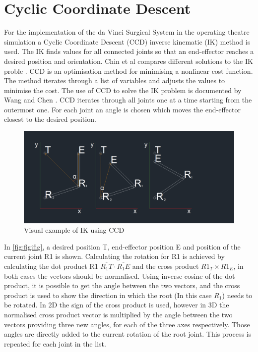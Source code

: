 \chapter{Cyclic Coordinate Descent}
For the implementation of the da Vinci Surgical System in the operating theatre simulation a Cyclic Coordinate Descent (CCD) inverse kinematic (IK) method is used. The IK finds values for all connected joints so that an end-effector reaches a desired position and orientation. Chin et al compares different solutions to the IK proble \citep{kwan_wu_chin_closed-form_1997}. CCD is an optimisation method for minimising a nonlinear cost function. The method iterates through a list of variables and adjusts the values to minimise the cost. The use of CCD to solve the IK problem is documented by Wang and Chen \citep{wang_combined_1991}. CCD iterates through all joints one at a time starting from the outermost one. For each joint an angle is chosen which moves the end-effector closest to the desired position.
\begin{figure}[h]
\centering
\includegraphics[width=\textwidth]{CCD/IKCCD.png}
\caption{Visual example of IK using CCD }
\label{fig:figifig}
\end{figure}

In \autoref{fig:figifig}, a desired position T, end-effector position E and position of the current joint R1 is shown. Calculating the rotation for R1 is achieved by calculating the dot product R1 $\overline{R_1T} \cdot \overline{R_1E}$  and the cross product $R1_T \times R1_E$, in both cases the vectors should be normalised. Using inverse cosine of the dot product, it is possible to get the angle between the two vectors, and the cross product is used to show the direction in which the root (In this case $R_1$) needs to be rotated. In 2D the sign of the cross product is used, however in 3D the normalised cross product vector is multiplied by the angle between the two vectors providing three new angles, for each of the three axes respectively. Those angles are directly added to the current rotation of the root joint. This process is repeated for each joint in the list.

